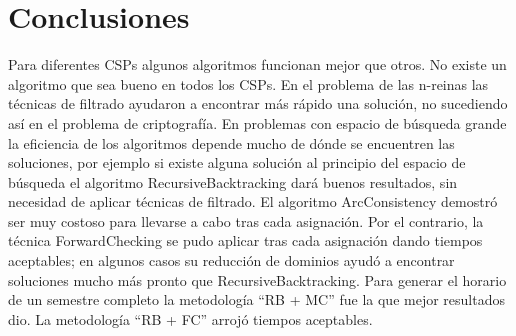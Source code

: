\section{Conclusiones}

Para diferentes CSPs algunos algoritmos funcionan mejor que otros. No existe un algoritmo que sea bueno en todos los CSPs. En el problema de las n-reinas las t\'ecnicas de filtrado ayudaron a encontrar m\'as r\'apido una soluci\'on, no sucediendo as\'i en el problema de criptograf\'ia. En problemas con espacio de b\'usqueda grande la eficiencia de los algoritmos depende mucho de d\'onde se encuentren las soluciones, por ejemplo si existe alguna soluci\'on al principio del espacio de b\'usqueda el algoritmo \textsf{RecursiveBacktracking} dar\'a buenos resultados, sin necesidad de aplicar t\'ecnicas de filtrado. El algoritmo \textsf{ArcConsistency} demostr\'o ser muy costoso para llevarse a cabo tras cada asignaci\'on. Por el contrario, la t\'ecnica \textsf{ForwardChecking} se pudo aplicar tras cada asignaci\'on dando tiempos aceptables; en algunos casos su reducci\'on de dominios ayud\'o a encontrar soluciones mucho m\'as pronto que \textsf{RecursiveBacktracking}. Para generar el horario de un semestre completo la metodolog\'ia ``RB + MC'' fue la que mejor resultados dio. La metodolog\'ia ``RB + FC'' arroj\'o tiempos aceptables.


